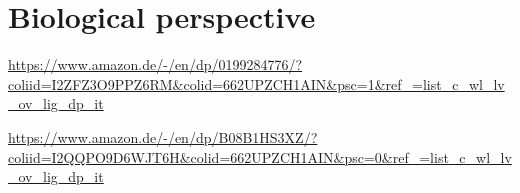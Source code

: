 \chapter{Biological perspective}
\url{https://www.amazon.de/-/en/dp/0199284776/?coliid=I2ZFZ3O9PPZ6RM&colid=662UPZCH1AIN&psc=1&ref_=list_c_wl_lv_ov_lig_dp_it}
    
\url{https://www.amazon.de/-/en/dp/B08B1HS3XZ/?coliid=I2QQPO9D6WJT6H&colid=662UPZCH1AIN&psc=0&ref_=list_c_wl_lv_ov_lig_dp_it}